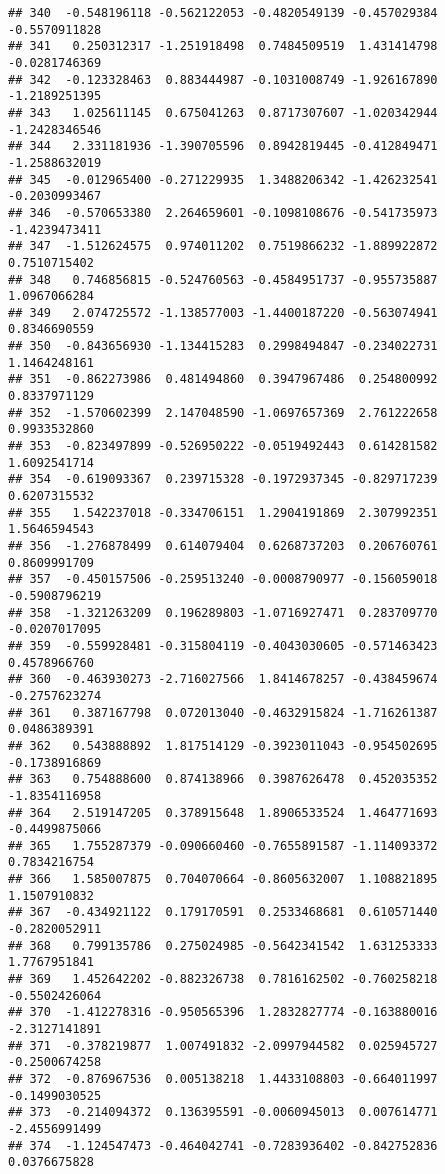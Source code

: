 \documentclass[
]{article}
\begin{document}
\begin{verbatim}
## 340  -0.548196118 -0.562122053 -0.4820549139 -0.457029384 -0.5570911828
## 341   0.250312317 -1.251918498  0.7484509519  1.431414798 -0.0281746369
## 342  -0.123328463  0.883444987 -0.1031008749 -1.926167890 -1.2189251395
## 343   1.025611145  0.675041263  0.8717307607 -1.020342944 -1.2428346546
## 344   2.331181936 -1.390705596  0.8942819445 -0.412849471 -1.2588632019
## 345  -0.012965400 -0.271229935  1.3488206342 -1.426232541 -0.2030993467
## 346  -0.570653380  2.264659601 -0.1098108676 -0.541735973 -1.4239473411
## 347  -1.512624575  0.974011202  0.7519866232 -1.889922872  0.7510715402
## 348   0.746856815 -0.524760563 -0.4584951737 -0.955735887  1.0967066284
## 349   2.074725572 -1.138577003 -1.4400187220 -0.563074941  0.8346690559
## 350  -0.843656930 -1.134415283  0.2998494847 -0.234022731  1.1464248161
## 351  -0.862273986  0.481494860  0.3947967486  0.254800992  0.8337971129
## 352  -1.570602399  2.147048590 -1.0697657369  2.761222658  0.9933532860
## 353  -0.823497899 -0.526950222 -0.0519492443  0.614281582  1.6092541714
## 354  -0.619093367  0.239715328 -0.1972937345 -0.829717239  0.6207315532
## 355   1.542237018 -0.334706151  1.2904191869  2.307992351  1.5646594543
## 356  -1.276878499  0.614079404  0.6268737203  0.206760761  0.8609991709
## 357  -0.450157506 -0.259513240 -0.0008790977 -0.156059018 -0.5908796219
## 358  -1.321263209  0.196289803 -1.0716927471  0.283709770 -0.0207017095
## 359  -0.559928481 -0.315804119 -0.4043030605 -0.571463423  0.4578966760
## 360  -0.463930273 -2.716027566  1.8414678257 -0.438459674 -0.2757623274
## 361   0.387167798  0.072013040 -0.4632915824 -1.716261387  0.0486389391
## 362   0.543888892  1.817514129 -0.3923011043 -0.954502695 -0.1738916869
## 363   0.754888600  0.874138966  0.3987626478  0.452035352 -1.8354116958
## 364   2.519147205  0.378915648  1.8906533524  1.464771693 -0.4499875066
## 365   1.755287379 -0.090660460 -0.7655891587 -1.114093372  0.7834216754
## 366   1.585007875  0.704070664 -0.8605632007  1.108821895  1.1507910832
## 367  -0.434921122  0.179170591  0.2533468681  0.610571440 -0.2820052911
## 368   0.799135786  0.275024985 -0.5642341542  1.631253333  1.7767951841
## 369   1.452642202 -0.882326738  0.7816162502 -0.760258218 -0.5502426064
## 370  -1.412278316 -0.950565396  1.2832827774 -0.163880016 -2.3127141891
## 371  -0.378219877  1.007491832 -2.0997944582  0.025945727 -0.2500674258
## 372  -0.876967536  0.005138218  1.4433108803 -0.664011997 -0.1499030525
## 373  -0.214094372  0.136395591 -0.0060945013  0.007614771 -2.4556991499
## 374  -1.124547473 -0.464042741 -0.7283936402 -0.842752836  0.0376675828

\end{verbatim}
\end{document}
